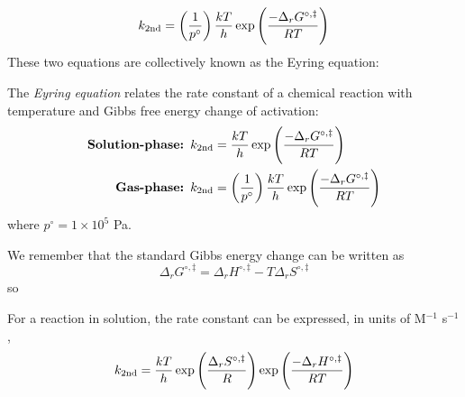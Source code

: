 \begin{equation}
\label{tst2.2}
  k_{\text{2nd}}=\left(\frac{1}{p^{\circ}} \right)\frac{kT}{h}\exp \left(\frac{-\Delta_rG^{\circ,\ddag}}{RT} \right)
\end{equation}
These two equations are collectively known as the Eyring equation:
\begin{thrm}
The \emph{Eyring equation} relates the rate constant of a chemical reaction with temperature and Gibbs free energy change of activation:
\begin{equation}
\begin{aligned}
\textbf{Solution-phase: }&k_{\text{2nd}}=\frac{kT}{h}\exp \left(\frac{-\Delta_rG^{\circ,\ddag}}{RT} \right)\\
\textbf{Gas-phase: } &k_{\text{2nd}}=\left(\frac{1}{p^{\circ}} \right)\frac{kT}{h}\exp \left(\frac{-\Delta_rG^{\circ,\ddag}}{RT} \right)
\end{aligned}
\end{equation}
where $p^{\circ}=1\times10^5$ Pa.
\end{thrm}
We remember that the standard Gibbs energy change can be written as
\begin{equation}
  \Delta_rG^{\circ,\ddag}=\Delta_rH^{\circ,\ddag}-T\Delta_rS^{\circ,\ddag}
\end{equation}
so 
\begin{thrm}
For a reaction in solution, the rate constant can be expressed, in units of M$^{-1}$ s$^{-1}$,
\begin{equation}
\label{tst3}
  k_{\text{2nd}}=\frac{kT}{h}\exp \left(\frac{\Delta_rS^{\circ,\ddag}}{R} \right)\exp \left(\frac{-\Delta_rH^{\circ,\ddag}}{RT} \right)
\end{equation}
\end{thrm}
